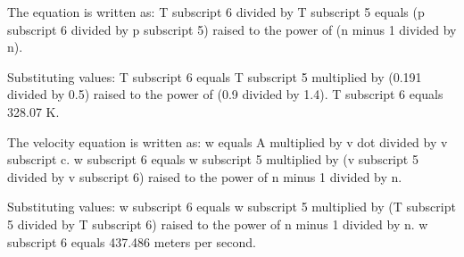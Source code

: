 The equation is written as:  
T subscript 6 divided by T subscript 5 equals (p subscript 6 divided by p subscript 5) raised to the power of (n minus 1 divided by n).  

Substituting values:  
T subscript 6 equals T subscript 5 multiplied by (0.191 divided by 0.5) raised to the power of (0.9 divided by 1.4).  
T subscript 6 equals 328.07 K.  

The velocity equation is written as:  
w equals A multiplied by v dot divided by v subscript c.  
w subscript 6 equals w subscript 5 multiplied by (v subscript 5 divided by v subscript 6) raised to the power of n minus 1 divided by n.  

Substituting values:  
w subscript 6 equals w subscript 5 multiplied by (T subscript 5 divided by T subscript 6) raised to the power of n minus 1 divided by n.  
w subscript 6 equals 437.486 meters per second.